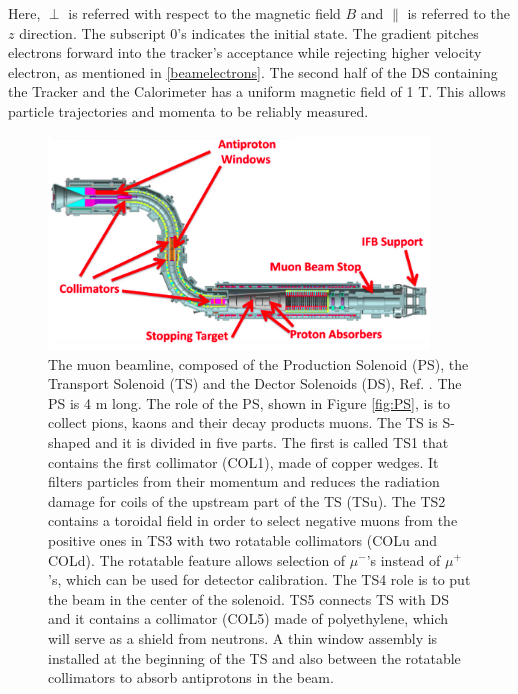Here, $\perp$ is referred with respect to the magnetic field $B$ and $\parallel$ is referred to the $z$ direction. The subscript 0’s indicates the initial state. The gradient pitches electrons forward into the tracker's acceptance while rejecting higher velocity electron, as mentioned in \ref{beamelectrons}. 
The second half of the DS containing the Tracker and the Calorimeter has a uniform magnetic field of 1 T. This allows particle trajectories and momenta to be reliably measured.
\begin{figure}[!h]
\centering
\includegraphics[width =0.9\textwidth]{images/chapter2/Screenshot_20240303_152845.png}
\caption{The muon beamline, composed of the Production Solenoid (PS), the Transport Solenoid (TS) and the Dector Solenoids (DS), Ref. \cite{ginther}. The PS is 4 m long. The role of the PS, shown in Figure \ref{fig:PS}, is to collect pions, kaons and their decay products muons. The TS is S-shaped and it is divided in five parts. The first is called TS1 that contains the first collimator (COL1), made of copper wedges. It filters particles from their momentum and reduces the radiation damage for coils of the upstream part of the TS (TSu). The TS2 contains a toroidal field in order to select negative muons from the positive ones in TS3 with two rotatable collimators (COLu and COLd). The rotatable feature allows selection of $\mu^-$'s instead of $\mu^+$'s, which can be used for detector calibration. The TS4 role is to put the beam in the center of the solenoid. TS5 connects TS with DS and it contains a collimator (COL5) made of polyethylene, which will serve as a shield from neutrons. A thin window assembly is installed at the beginning of the TS and also between the rotatable collimators to absorb antiprotons in the beam.
}
\end{figure}
